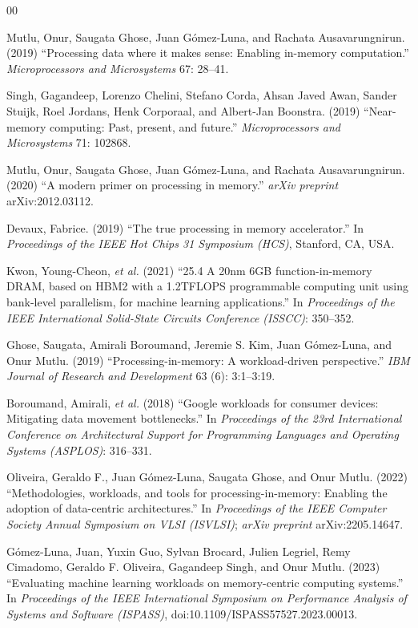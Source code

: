 \documentclass{ieeeaccess}
\begin{document}
\begin{thebibliography}{00}

 Mutlu, Onur, Saugata Ghose, Juan G\'omez-Luna, and Rachata Ausavarungnirun. (2019) ``Processing data where it makes sense: Enabling in-memory computation.'' \emph{Microprocessors and Microsystems} 67: 28--41.

 Singh, Gagandeep, Lorenzo Chelini, Stefano Corda, Ahsan Javed Awan, Sander Stuijk, Roel Jordans, Henk Corporaal, and Albert-Jan Boonstra. (2019) ``Near-memory computing: Past, present, and future.'' \emph{Microprocessors and Microsystems} 71: 102868.

 Mutlu, Onur, Saugata Ghose, Juan G\'omez-Luna, and Rachata Ausavarungnirun. (2020) ``A modern primer on processing in memory.'' \emph{arXiv preprint} arXiv:2012.03112.

 Devaux, Fabrice. (2019) ``The true processing in memory accelerator.'' In \emph{Proceedings of the IEEE Hot Chips 31 Symposium (HCS)}, Stanford, CA, USA.

 Kwon, Young-Cheon, \emph{et al.} (2021) ``25.4 A 20nm 6GB function-in-memory DRAM, based on HBM2 with a 1.2TFLOPS programmable computing unit using bank-level parallelism, for machine learning applications.'' In \emph{Proceedings of the IEEE International Solid-State Circuits Conference (ISSCC)}: 350--352.

 Ghose, Saugata, Amirali Boroumand, Jeremie S. Kim, Juan G\'omez-Luna, and Onur Mutlu. (2019) ``Processing-in-memory: A workload-driven perspective.'' \emph{IBM Journal of Research and Development} 63 (6): 3:1--3:19.

 Boroumand, Amirali, \emph{et al.} (2018) ``Google workloads for consumer devices: Mitigating data movement bottlenecks.'' In \emph{Proceedings of the 23rd International Conference on Architectural Support for Programming Languages and Operating Systems (ASPLOS)}: 316--331.

 Oliveira, Geraldo F., Juan G\'omez-Luna, Saugata Ghose, and Onur Mutlu. (2022) ``Methodologies, workloads, and tools for processing-in-memory: Enabling the adoption of data-centric architectures.'' In \emph{Proceedings of the IEEE Computer Society Annual Symposium on VLSI (ISVLSI)}; \emph{arXiv preprint} arXiv:2205.14647.

 G\'omez-Luna, Juan, Yuxin Guo, Sylvan Brocard, Julien Legriel, Remy Cimadomo, Geraldo F. Oliveira, Gagandeep Singh, and Onur Mutlu. (2023) ``Evaluating machine learning workloads on memory-centric computing systems.'' In \emph{Proceedings of the IEEE International Symposium on Performance Analysis of Systems and Software (ISPASS)}, doi:10.1109/ISPASS57527.2023.00013.


\end{thebibliography}
\end{document}
